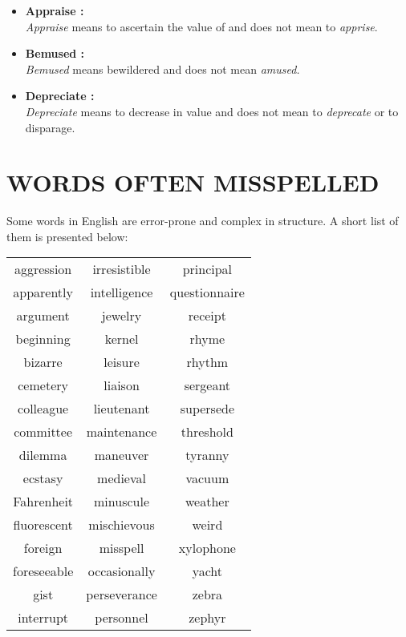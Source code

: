 \documentclass{report}
\begin{document}
\begin{itemize}
        \item
        \textbf{\Large{Appraise :}}\\    
        \textit{Appraise} means to ascertain the value of and does not mean to \textit{apprise}.
        \bigskip
        
        \item
        \textbf{\Large{Bemused :}}\\    
        \textit{Bemused} means bewildered and does not mean \textit{amused.}
    
        \bigskip
        
        \item
        \textbf{\Large{Depreciate :}}\\  
        \textit{Depreciate} means to decrease in value and does not mean to \textit{deprecate} or to disparage.
        
    \end{itemize}
    
    
    \chapter{WORDS OFTEN MISSPELLED}
    Some words in English are error-prone and complex in structure. A short list of them is presented below:
    
    \bigskip
    \fontsize{15}{18}
    
    \begin{center}
    \begin{tabular}{c c c}
     aggression & irresistible & principal\\
     apparently	& intelligence & questionnaire \\
     argument & jewelry & receipt\\
     beginning & kernel & rhyme\\
     bizarre & leisure & rhythm \\
     cemetery & liaison & sergeant \\
     colleague & lieutenant & supersede\\
     committee & maintenance & threshold\\
     dilemma & maneuver & tyranny\\
     ecstasy & medieval & vacuum\\
     Fahrenheit & minuscule & weather\\
     fluorescent & mischievous & weird\\
     foreign & misspell & xylophone\\
     foreseeable & occasionally & yacht\\
     gist & perseverance & zebra\\
     interrupt & personnel & zephyr\\
    \end{tabular}
    \end{center}
    \bigskip
    
\end{document}
